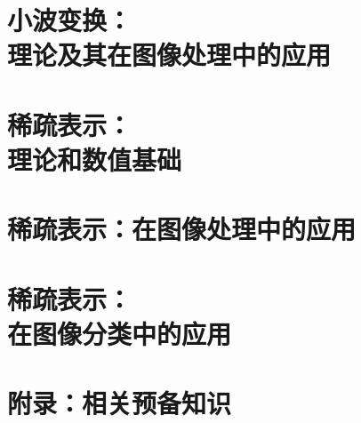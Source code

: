 
\part{小波变换：\\理论及其在图像处理中的应用}
\part{稀疏表示：\\理论和数值基础}
%
\part{稀疏表示：在图像处理中的应用}
\part{稀疏表示：\\在图像分类中的应用}

\part{附录：相关预备知识}
